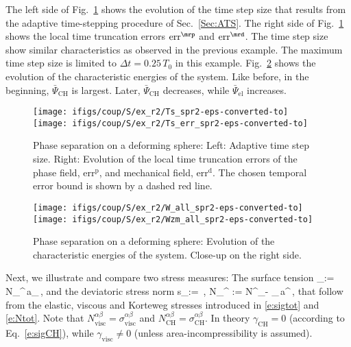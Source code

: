 \documentclass[11pt]{article}
\begin{document}
The left side of Fig.~\ref{fig:s_ts2} shows the evolution of the time step size that results from the adaptive time-stepping procedure of Sec.~\ref{Sec:ATS}. 
The right side of Fig.~\ref{fig:s_ts2} shows the local time truncation errors $\text{err}^\mrp$ and $\text{err}^\mrd$. 
The time step size show similar characteristics as observed in the previous example. 
The maximum time step size is limited to $\Delta t= 0.25\,T_0$ in this example. Fig.~\ref{fig:s_ene2} shows the evolution of the characteristic energies of the system. 
Like before, in the beginning, $\bar\Psi_\mathrm{CH}$ is largest.
Later, $\bar\Psi_\mathrm{CH}$ decreases, while $\bar\Psi_\mathrm{el}$ increases. 
\begin{figure}[H]
\centering
\texttt{[image: ifigs/coup/S/ex\_r2/Ts\_spr2-eps-converted-to]}
\texttt{[image: ifigs/coup/S/ex\_r2/Ts\_err\_spr2-eps-converted-to]}
\caption{Phase separation on a deforming sphere: Left: Adaptive time step size. Right: Evolution of the local time truncation errors of the phase field, $\mathrm{err}^\mathrm{p}$, and mechanical field, $\mathrm{err}^\mathrm{d}$. The chosen temporal error bound is shown by a dashed red line.}
\label{fig:s_ts2}
\end{figure}
\begin{figure}[H]
\centering
\texttt{[image: ifigs/coup/S/ex\_r2/W\_all\_spr2-eps-converted-to]}
\texttt{[image: ifigs/coup/S/ex\_r2/Wzm\_all\_spr2-eps-converted-to]}
\caption{Phase separation on a deforming sphere: Evolution of the characteristic energies of the system. Close-up on the right side.}
\label{fig:s_ene2}
\end{figure}
Next, we illustrate and compare two stress measures: 
The surface tension
\gamma_\bullet := \ds{}N_\bullet^{\alpha\beta}\,a_{\alpha\beta}\,,
\label{e:ngc}
\eqe
and the deviatoric stress norm
s_\bullet := \ds{}\,,\quad
N_^{\alpha\beta} := N^{\alpha\beta}_\bullet - \gamma_\bullet\,a^{\alpha\beta}\,,
\label{e:Mises}
\eqe
that follow from the elastic, viscous and Korteweg stresses introduced in \eqref{e:sigtot} and \eqref{e:Ntot}. Note that $N_{\mathrm{visc}}^{\alpha\beta} = \sigma_{\mathrm{visc}}^{\alpha\beta}$ and $N_{\mathrm{CH}}^{\alpha\beta} = \sigma_{\mathrm{CH}}^{\alpha\beta}$.
In theory $\gamma_\mathrm{CH}=0$ (according to Eq.~\eqref{e:sigCH}), while $\gamma_\mathrm{visc} \neq 0$ (unless area-incompressibility is assumed).
\end{document}
